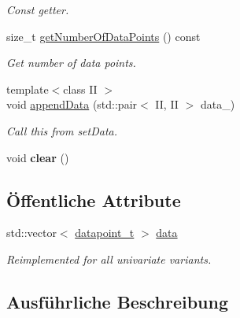\begin{DoxyCompactItemize}
\begin{DoxyCompactList}\small\item\em Const getter. \item\end{DoxyCompactList}\item 
size\_\-t \hyperlink{classCDA_1_1EMData_a9017a2d49d784e6bf0da22a1ef533496}{getNumberOfDataPoints} () const 
\begin{DoxyCompactList}\small\item\em Get number of data points. \item\end{DoxyCompactList}\item 
{\footnotesize template$<$class II $>$ }\\void \hyperlink{classCDA_1_1EMData_aeb4dcfb6c410636f5f88a9cbcbda407c}{appendData} (std::pair$<$ II, II $>$ data\_\-)
\begin{DoxyCompactList}\small\item\em Call this from setData. \item\end{DoxyCompactList}\item 
\hypertarget{classCDA_1_1EMData_a498e9e7ea3463a58c2623b0b40d10a50}{
void {\bfseries clear} ()}
\label{classCDA_1_1EMData_a498e9e7ea3463a58c2623b0b40d10a50}

\end{DoxyCompactItemize}
\subsection*{Öffentliche Attribute}
\begin{DoxyCompactItemize}
\item 
\hypertarget{classCDA_1_1EMData_a2c3eec1a4ba1476128790235bf814a21}{
std::vector$<$ \hyperlink{classCDA_1_1EMData_a320dfbd3ad13091a99602a140688a05d}{datapoint\_\-t} $>$ \hyperlink{classCDA_1_1EMData_a2c3eec1a4ba1476128790235bf814a21}{data}}
\label{classCDA_1_1EMData_a2c3eec1a4ba1476128790235bf814a21}

\begin{DoxyCompactList}\small\item\em Reimplemented for all univariate variants. \item\end{DoxyCompactList}\end{DoxyCompactItemize}


\subsection{Ausführliche Beschreibung}
